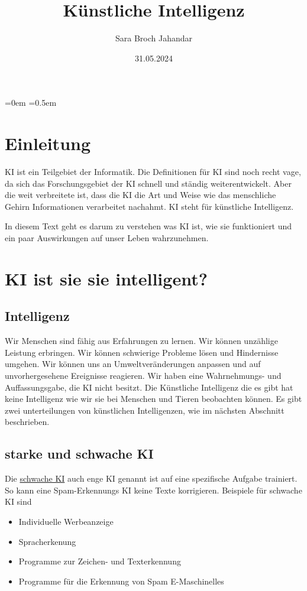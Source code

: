 \documentclass{report}
\title{Künstliche Intelligenz }
\author{Sara Broch Jahandar}
\date{31.05.2024}
\begin{document}
\maketitle



\tableofcontents
\parindent=0em
\parskip=0.5em
\chapter{Einleitung}

KI ist ein Teilgebiet der Informatik. Die Definitionen für KI sind noch recht vage, da sich das Forschungsgebiet der KI schnell und ständig weiterentwickelt. Aber die weit verbreitete ist,
dass die KI die Art und Weise wie das menschliche Gehirn Informationen verarbeitet nachahmt. KI steht für künstliche Intelligenz. 

In diesem Text geht es darum zu verstehen was KI ist, wie sie funktioniert und ein paar Auswirkungen auf unser Leben wahrzunehmen.
\chapter{KI ist sie sie intelligent?}

\section {Intelligenz}
Wir Menschen sind fähig aus Erfahrungen zu lernen. Wir können unzählige Leistung erbringen. Wir können schwierige Probleme lösen und Hindernisse umgehen. Wir können uns an Umweltveränderungen anpassen und auf unvorhergesehene Ereignisse reagieren. Wir haben eine Wahrnehmungs- und Auffassungsgabe, die KI nicht besitzt. Die Künstliche Intelligenz die es gibt hat keine Intelligenz wie wir sie bei Menschen und Tieren beobachten können.
Es gibt zwei unterteilungen von künstlichen Intelligenzen, wie im nächsten Abschnitt beschrieben.

\section{starke und schwache KI}
Die \underline{schwache KI} auch enge KI genannt ist auf eine spezifische Aufgabe trainiert. So kann eine Spam-Erkennungs KI keine Texte korrigieren.
Beispiele für schwache KI sind \begin{itemize}
    \item Individuelle Werbeanzeige
    \item Spracherkenung
    \item Programme zur Zeichen- und Texterkennung
    \item Programme für die Erkennung von Spam E-Maschinelles
\end{itemize}
\end{document}
